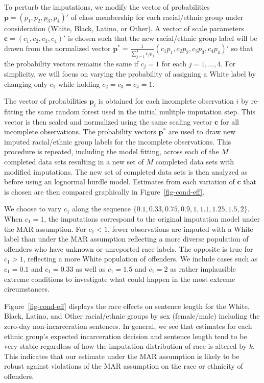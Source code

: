 \documentclass[
  letterpaper,
  DIV=11,
  numbers=noendperiod]{scrartcl}
\begin{document}
To perturb the imputations, we modify the vector of probabilities
\(\mathbf{p} = (p_1, p_2, p_3, p_4)'\) of class membership for each
racial/ethnic group under consideration (White, Black, Latino, or
Other). A vector of scale parameters
\(\mathbf{c} = (c_1, c_2, c_3, c_4)'\) is chosen such that the new
racial/ethnic group label will be drawn from the normalized vector
\(\mathbf{p}^* = \frac{1}{\sum_{j=1}^4 c_j p_j} (c_1 p_1, c_2 p_2, c_3 p_3, c_4 p_4)'\)
so that the probability vectors remains the same if \(c_j = 1\) for each
\(j = 1,\dots,4.\) For simplicity, we will focus on varying the
probability of assigning a White label by changing only \(c_1\) while
holding \(c_2 = c_3 = c_4 = 1.\)

The vector of probabilities \(\mathbf{p}_i\) is obtained for each
incomplete observation \(i\) by re-fitting the same random forest used
in the initial mulitple imputation step. This vector is then scaled and
normalized using the same scaling vector \(\mathbf{c}\) for all
incomplete observations. The probability vectors \(\mathbf{p}^*\) are
used to draw new imputed racial/ethnic group labels for the incomplete
observations. This procedure is repeated, including the model fitting,
across each of the \(M\) completed data sets resulting in a new set of
\(M\) completed data sets with modified imputations. The new set of
completed data sets is then analyzed as before using an lognormal hurdle
model. Estimates from each variation of \(\mathbf{c}\) that is chosen
are then compared graphically in Figure~\ref{fig-cond-eff}.

We choose to vary \(c_1\) along the sequence
\(\{0.1, 0.33, 0.75, 0.9, 1, 1.1, 1.25, 1.5, 2\}.\) When \(c_1 = 1\),
the imputations correspond to the original imputation model under the
MAR assumption. For \(c_1 < 1\), fewer observations are imputed with a
White label than under the MAR assumption reflecting a more diverse
population of offenders who have unknown or unreported race labels. The
opposite is true for \(c_1 > 1\), reflecting a more White population of
offenders. We include cases such as \(c_1 = 0.1\) and \(c_1 = 0.33\) as
well as \(c_1 = 1.5\) and \(c_1 = 2\) as rather implausible extreme
conditions to investigate what could happen in the most extreme
circumstances.

Figure~\ref{fig-cond-eff} displays the race effects on sentence length
for the White, Black, Latino, and Other racial/ethnic groups by sex
(female/male) including the zero-day non-incarceration sentences. In
general, we see that estimates for each ethnic group's expected
incarceration decision and sentence length tend to be very stable
regardless of how the imputation distribution of race is altered by
\(k\). This indicates that our estimate under the MAR assumption is
likely to be robust against violations of the MAR assumption on the race
or ethnicity of offenders.
\end{document}
